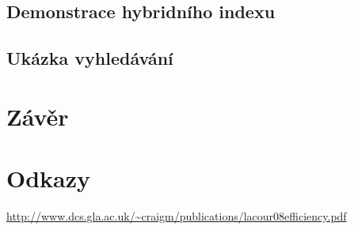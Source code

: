 \documentclass[11pt]{article}
\begin{document}
\subsection{Demonstrace hybridního indexu}
\subsection{Ukázka vyhledávání}


\section{Závěr}

\section{Odkazy}
\url{http://www.dcs.gla.ac.uk/~craigm/publications/lacour08efficiency.pdf}


\end{document}
